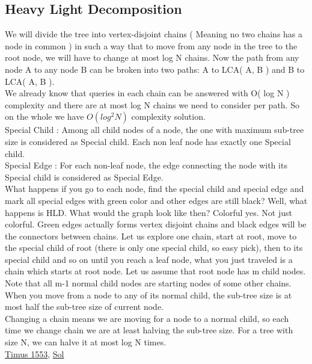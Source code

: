\documentclass[8pt, a4paper, oneside, twocolumn]{extarticle}
\begin{document}
\subsection{Heavy Light Decomposition}
We will divide the tree into vertex-disjoint chains ( Meaning no two chains has a node in common ) in such a way that to move from any node in the tree to the root node, we will have to change at most log N chains. Now the path from any node A to any node B can be  broken into two paths: A to LCA( A, B ) and B to LCA( A, B ).
\\We already know that queries in each chain can be answered with O( log N ) complexity and there are at most log N chains we need to consider per path. So on the whole we have $O(log^2 N)$ complexity solution.
\\Special Child : Among all child nodes of a node, the one with maximum sub-tree size is considered as Special child. Each non leaf node has exactly one Special child.
\\Special Edge : For each non-leaf node, the edge connecting the node with its Special child is considered as Special Edge.
\\What happens if you go to each node, find the special child and special edge and mark all special edges with green color and other edges are still black? Well, what happens is HLD. What would the graph look like then? Colorful yes. Not just colorful. Green edges actually forms vertex disjoint chains and black edges will be the connectors between chains. Let us explore one chain, start at root, move to the special child of root (there is only one special child, so easy pick), then to its special child and so on until you reach a leaf node, what you just traveled is a chain which starts at root node. Let us assume that root node has m child nodes. Note that all m-1 normal child nodes are starting nodes of some other chains.
\\When you move from a node to any of its normal child, the sub-tree size is at most half the sub-tree size of current node.
\\Changing a chain means we are moving for a node to a normal child, so each time we change chain we are at least halving the sub-tree size. For a tree with size N, we can halve it at most log N times.
\\\href{http://acm.timus.ru/problem.aspx?space=1&num=1553}{Timus 1553}, \href{https://github.com/sourabhxyz/Competitive-Programming/blob/master/timus/1553.cpp}{Sol}
\end{document}
